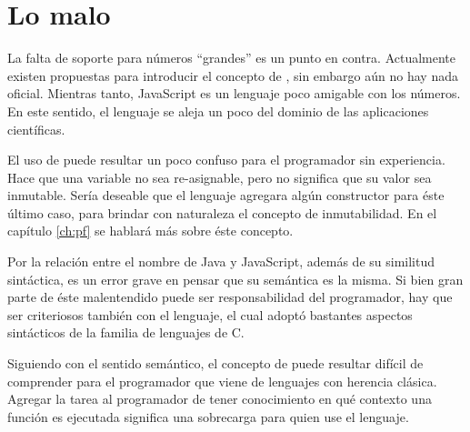 \section{Lo malo}

La falta de soporte para números "`grandes"' es un punto en contra. Actualmente existen propuestas para introducir el concepto de , sin embargo aún no hay nada oficial. Mientras tanto, JavaScript es un lenguaje poco amigable con los números. En este sentido, el lenguaje se aleja un poco del dominio de las aplicaciones científicas.

El uso de  puede resultar un poco confuso para el programador sin experiencia. Hace que una variable no sea re-asignable, pero no significa que su valor sea inmutable. Sería deseable que el lenguaje agregara algún constructor para éste último caso, para brindar con naturaleza el concepto de inmutabilidad. En el capítulo \ref{ch:pf} se hablará más sobre éste concepto.

Por la relación entre el nombre de Java y JavaScript, además de su similitud sintáctica, es un error grave en pensar que su semántica es la misma. Si bien gran parte de éste malentendido puede ser responsabilidad del programador, hay que ser criteriosos también con el lenguaje, el cual adoptó bastantes aspectos sintácticos de la familia de lenguajes de C.

Siguiendo con el sentido semántico, el concepto de  puede resultar difícil de comprender para el programador que viene de lenguajes con herencia clásica. Agregar la tarea al programador de tener conocimiento en qué contexto una función es ejecutada significa una sobrecarga para quien use el lenguaje.